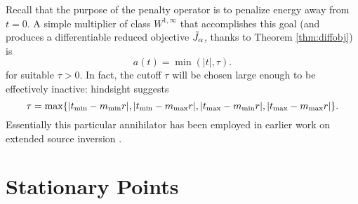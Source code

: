 Recall that the purpose of the penalty operator is to penalize energy away from 
$t=0$. A simple multiplier of class $W^{1,\infty}$ that accomplishes
this goal (and produces a differentiable reduced objective $\tilde{J}_{\alpha}$,
thanks to Theorem \ref{thm:diffobj}) is
\begin{equation}
  \label{eqn:ann}
  a(t) = \min(|t|, \tau). 
\end{equation}
for suitable $\tau>0$. In fact, 
the cutoff $\tau$ will be chosen large enough to be effectively inactive: 
hindsight suggests 
\begin{equation}
  \label{eqn:taudef}
  \tau = \max\{|t_{\rm min}-m_{\rm min}r|,|t_{\rm min}-m_{\rm max}r|, |t_{\rm max}-m_{\rm min}r|, |t_{\rm max}-m_{\rm max}r|\}. 
\end{equation}
Essentially this 
particular annihilator has been employed in earlier work on extended 
source inversion 
\cite[]{Plessix:00a,LuoSava:11,Warner:14,HuangSymes:SEG15a,Warner:16,HuangSymes:Geo17}.

\section{Stationary Points}

